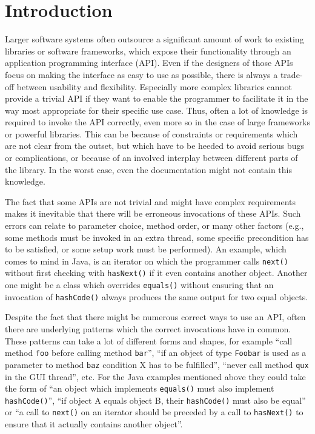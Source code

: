 \chapter{Introduction}\label{ch:intro}

Larger software systems often outsource a significant amount of work to existing libraries or software frameworks, which expose their functionality through an application programming interface (API).
Even if the designers of those APIs focus on making the interface as easy to use as possible, there is always a trade-off between usability and flexibility.
Especially more complex libraries cannot provide a trivial API if they want to enable the programmer to facilitate it in the way most appropriate for their specific use case.
Thus, often a lot of knowledge is required to invoke the API correctly, even more so in the case of large frameworks or powerful libraries.
This can be because of constraints or requirements which are not clear from the outset, but which have to be heeded to avoid serious bugs or complications, or because of an involved interplay between different parts of the library.
In the worst case, even the documentation might not contain this knowledge.

The fact that some APIs are not trivial and might have complex requirements makes it inevitable that there will be erroneous invocations of these APIs.
Such errors can relate to parameter choice, method order, or many other factors (e.g., some methods must be invoked in an extra thread, some specific precondition has to be satisfied, or some setup work must be performed).
An example, which comes to mind in Java, is an iterator on which the programmer calls \texttt{next()} without first checking with \texttt{hasNext()} if it even contains another object.
Another one might be a class which overrides \texttt{equals()} without ensuring that an invocation of \texttt{hashCode()} always produces the same output for two equal objects.

Despite the fact that there might be numerous correct ways to use an API, often there are underlying patterns which the correct invocations have in common.
These patterns can take a lot of different forms and shapes, for example ``call method \texttt{foo} before calling method \texttt{bar}'', ``if an object of type \texttt{Foobar} is used as a parameter to method \texttt{baz} condition X has to be fulfilled'', ``never call method \texttt{qux} in the GUI thread'', etc.
For the Java examples mentioned above they could take the form of ``an object which implements \texttt{equals()} must also implement \texttt{hashCode()}'', ``if object A equals object B, their \texttt{hashCode()} must also be equal'' or ``a call to \texttt{next()} on an iterator should be preceded by a call to \texttt{hasNext()} to ensure that it actually contains another object''.

